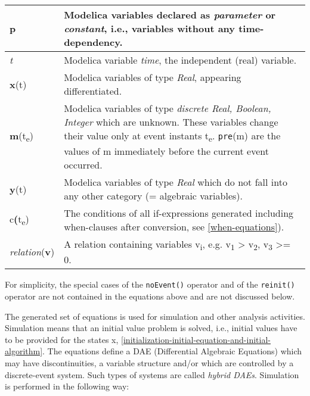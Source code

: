 \begin{longtable}[]{|p{2cm}|p{12cm}|}
\hline \endhead
\textbf{p} & Modelica variables declared as \emph{parameter} or
\emph{constant}, i.e., variables without any
time-dependency.\\ \hline
\emph{t} & Modelica variable \emph{time}, the independent (real)
variable.\\ \hline
\textbf{x}(t) & Modelica variables of type \emph{Real}, appearing
differentiated.\\ \hline
\textbf{m}(t\textsubscript{e}) & Modelica variables of type
\emph{discrete Real, Boolean, Integer} which are unknown. These
variables change their value only at event instants t\textsubscript{e}.
\lstinline[basicstyle=\ttfamily]!pre!(m) are the values of m immediately before the current event
occurred.\\ \hline
\textbf{y}(t) & Modelica variables of type \emph{Real} which do not fall
into any other category (= algebraic variables).\\ \hline
c\textbf{(}t\textsubscript{e}) & The conditions of all if-expressions
generated including when-clauses after conversion, see \autoref{when-equations}).\\ \hline
\emph{relation}(\textbf{v}) & A relation containing variables
v\textsubscript{i}, e.g. v\textsubscript{1} \textgreater{}
v\textsubscript{2}, v\textsubscript{3} \textgreater{}= 0.\\ \hline

\end{longtable}

For simplicity, the special cases of the \lstinline[basicstyle=\ttfamily]!noEvent()! operator and of the
\lstinline[basicstyle=\ttfamily]!reinit()! operator are not contained in the equations above and are not
discussed below.

The generated set of equations is used for simulation and other analysis
activities. Simulation means that an initial value problem is solved,
i.e., initial values have to be provided for the states x, \autoref{initialization-initial-equation-and-initial-algorithm}.
The equations define a DAE (Differential Algebraic Equations) which may
have discontinuities, a variable structure and/or which are controlled
by a discrete-event system. Such types of systems are called
\emph{hybrid DAEs}. Simulation is performed in the following way:

